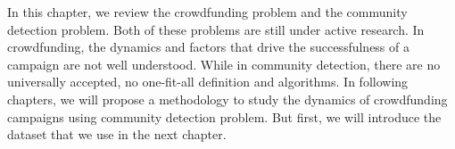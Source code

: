 
In this chapter, we review the crowdfunding problem and the community detection problem.
Both of these problems are still under active research.
In crowdfunding, the dynamics and factors that drive the successfulness of a campaign are not well understood.
While in community detection, there are no universally accepted, no one-fit-all definition and algorithms.
In following chapters, we will propose a methodology to study the dynamics of crowdfunding campaigns using community detection problem.
But first, we will introduce the dataset that we use in the next chapter.

